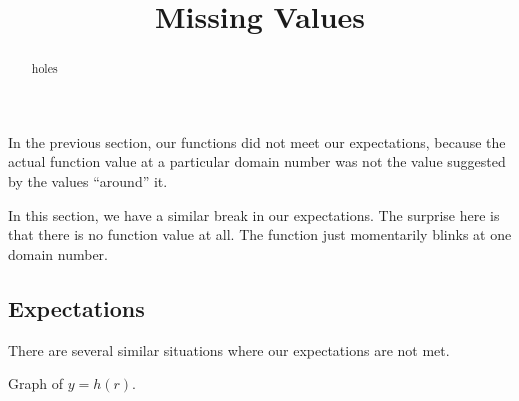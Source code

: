 \documentclass{ximera}
\title{Missing Values}
\begin{document}
\begin{abstract}
holes
\end{abstract}
\maketitle







In the previous section, our functions did not meet our expectations, because the actual function value at a particular domain number was not the value suggested by the values ``around'' it.



In this section, we have a similar break in our expectations. The surprise here is that there is no function value at all. The function just momentarily blinks at one domain number.



























\subsection{Expectations}

There are several similar situations where our expectations are not met.









Graph of $y = h(r)$.
\end{document}
